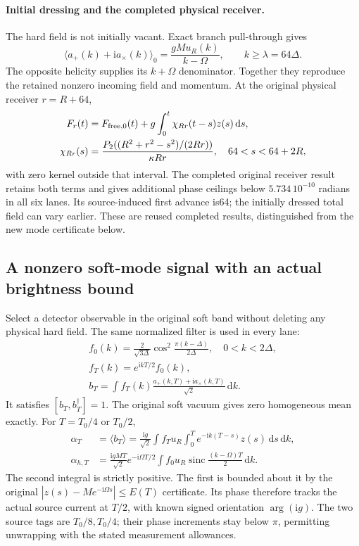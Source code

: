 \documentclass[10pt,twocolumn,letterpaper]{article}
\newcommand{\dd}{\mathrm{d}}
\begin{document}
\paragraph{Initial dressing and the completed physical receiver.}
The hard field is not initially vacant. Exact branch pull-through gives
\[
 \langle a_+(k)+\mathrm{i}a_\times(k)\rangle_0
       =\frac{gM u_R(k)}{k-\Omega},\qquad k\ge\lambda=64\Delta.
\]
The opposite helicity supplies its $k+\Omega$ denominator. Together they
reproduce the retained nonzero incoming field and momentum. At the original
physical receiver $r=R+64$,
\[
 \begin{split}
 F_r(t)&=F_{{\rm free},0}(t)+g\int_0^t\chi_{Rr}(t-s)z(s)\,\dd s,\\
 \chi_{Rr}(s)&=\frac{P_2((R^2+r^2-s^2)/(2Rr))}{\kappa Rr},
                 \quad64<s<64+2R,
 \end{split}
\]
with zero kernel outside that interval. The completed original receiver
result retains both terms and gives additional phase ceilings below
$5.734\,10^{-10}$ radians in all six lanes. Its source-induced first
advance is64; the initially dressed total field can vary earlier.
These are reused completed results, distinguished from the new mode
certificate below.

\subsection{A nonzero soft-mode signal with an actual brightness bound}
Select a detector observable in the original soft band without deleting
any physical hard field. The same normalized filter is used in every lane:
\[
 \begin{gathered}
 f_0(k)=\frac{2}{\sqrt{3\Delta}}
       \cos^2\!\frac{\pi(k-\Delta)}{2\Delta},\quad0<k<2\Delta,\\
 f_T(k)=e^{\mathrm{i}kT/2}f_0(k),\\
 b_T=\int f_T(k)\frac{a_+(k,T)+\mathrm{i}a_\times(k,T)}{\sqrt2}\,\dd k.
 \end{gathered}
\]
It satisfies $[b_T,b_T^\dagger]=1$. The original soft vacuum gives zero
homogeneous mean exactly. For $T=T_0/4$ or $T_0/2$,
\[
 \begin{split}
 \alpha_T&=\langle b_T\rangle
   =\frac{\mathrm{i}g}{\sqrt2}\int f_Tu_R
         \int_0^T e^{-\mathrm{i}k(T-s)}z(s)\,\dd s\,\dd k,\\
 \alpha_{h,T}&=\frac{\mathrm{i}gMT}{\sqrt2}e^{-\mathrm{i}\Omega T/2}
       \int f_0u_R\operatorname{sinc}\!\frac{(k-\Omega)T}{2}\,\dd k.
 \end{split}
\]
The second integral is strictly positive. The first is bounded about it by
the original $|z(s)-Me^{-\mathrm{i}\Omega s}|\le E(T)$ certificate.
Its phase therefore tracks the actual source current at $T/2$, with
known signed orientation $\arg(\mathrm{i}g)$. The two source tags are
$T_0/8,T_0/4$; their phase increments stay below $\pi$, permitting
unwrapping with the stated measurement allowances.
\end{document}

